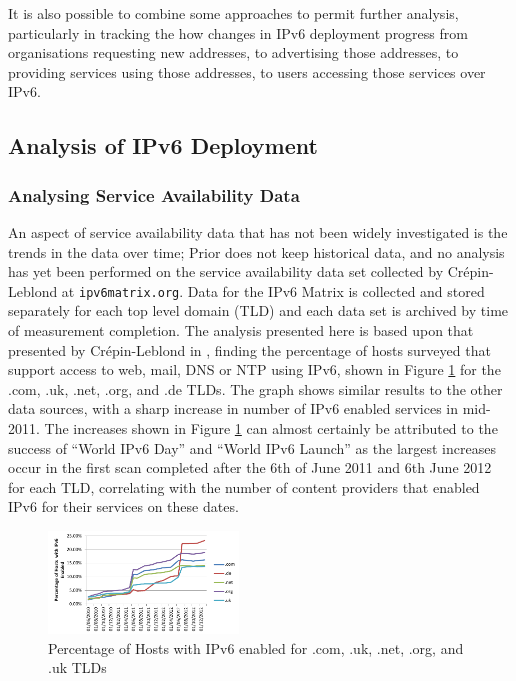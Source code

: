 It is also possible to combine some approaches to permit further analysis,
particularly in tracking the how changes in IPv6 deployment progress from
organisations requesting new addresses, to advertising those addresses, to
providing services using those addresses, to users accessing those
services over IPv6.

\subsection{Analysis of IPv6 Deployment}

\subsubsection{Analysing Service Availability Data}

An aspect of service availability data that has not been widely investigated is
the trends in the data over time; Prior does not keep historical data, and no
analysis has yet been performed on the service availability data set collected
by Crépin-Leblond at \verb+ipv6matrix.org+. Data for the IPv6 Matrix is
collected and stored separately for each top level domain (TLD) and each data set
is archived by time of measurement completion. The analysis presented here is
based upon that presented by Crépin-Leblond in
\cite{olivier_mj_crepin-leblond_ipv6_2011}, finding the percentage of hosts
surveyed that support access to web, mail, DNS or NTP using IPv6, shown in
Figure \ref{fig:output} for the .com, .uk, .net, .org, and .de TLDs. The graph shows
similar results to the other data sources, with a sharp increase in number of
IPv6 enabled services in mid-2011. The increases shown in Figure
\ref{fig:output} can almost
certainly be attributed to the success of ``World IPv6 Day'' and ``World IPv6 Launch''
as the largest
increases occur in the first scan completed after the 6th of June 2011 and 6th
June 2012
for each TLD, correlating with the number of content providers that enabled IPv6
for their services on these dates.

\begin{figure}[htb]
\centering
\includegraphics[width=0.45\textwidth]{img/output.png}
\caption{Percentage of Hosts with IPv6 enabled for .com, .uk, .net, .org, and
.uk TLDs}
\label{fig:output}
\end{figure}

